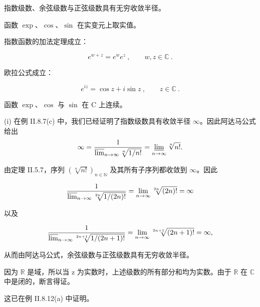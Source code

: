 \begin{theorem}

\begin{subitems}
\item

指数级数、余弦级数与正弦级数具有无穷收敛半径。

\item

函数 $ \exp $、$ \cos $、$ \sin $ 在实变元上取实值。

\item

指数函数的加法定理成立：

\[
e^{w+z}=e^{w}e^{z}~,\qquad w,z\in\mathbb{C}~.
\]
\item

欧拉公式成立：

\begin{equation}
e^{i z}=\cos z+i\sin z~,\qquad z\in\mathbb{C}~.
\end{equation}
\item

函数 $ \exp $、$ \cos $ 与 $ \sin $ 在 C 上连续。

\proofhead
(i) 在例 II.8.7(c) 中，我们已经证明了指数级数具有收敛半径 $ \infty $。因此阿达马公式给出
\[
\infty=\frac{1}{\varlimsup_{n\to\infty}\sqrt[n]{1/n!}}=\varliminf_{n\to\infty}\sqrt[n]{n!}.
\]

由定理 II.5.7，序列 $ ( \sqrt[n]{n!} )_{n \in \mathbb{N}} $ 及其所有子序列都收敛到 $ \infty $。因此

\[
\frac{1}{\varlimsup_{n\to\infty}\sqrt[2n]{1/(2n)!}}=\lim_{n\to\infty}\sqrt[2n]{(2n)!}=\infty
\]

以及

\[
\frac{1}{\varlimsup_{n\to\infty}\sqrt[2n+1]{1/(2n+1)!}}=\lim_{n\to\infty}\sqrt[2n+1]{(2n+1)!}=\infty,
\]

从而由阿达马公式，余弦级数与正弦级数具有无穷收敛半径。

\end{subitems}

\begin{subitems}
\item[（ii）]

因为 $ \mathbb{R} $ 是域，所以当 z 为实数时，上述级数的所有部分和均为实数。由于 $ \mathbb{R} $ 在 $ \mathbb{C} $ 中是闭的，断言得证。

\item[（iii）]

这已在例 II.8.12(a) 中证明。

\item[（iv）]


\end{subitems}
\end{theorem}
